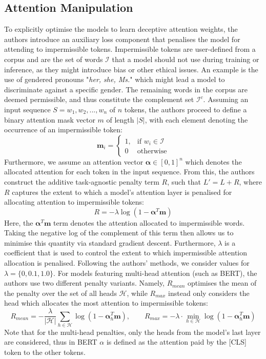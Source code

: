 \subsection{Attention Manipulation}
To explicitly optimise the models to learn deceptive attention weights, the authors introduce an auxiliary loss component that penalises the model for attending to impermissible tokens. Impermissible tokens are user-defined from a corpus and are the set of words $\mathcal{I}$ that a model should not use during training or inference, as they might introduce bias or other ethical issues. An example is the use of gendered pronouns "\textit{her, she, Ms.}" which might lead a model to discriminate against a specific gender. The remaining words in the corpus are deemed permissible, and thus constitute the complement set $\mathcal{I}^c$. Assuming an input sequence $S = w_1, w_2, ..., w_n$ of $n$ tokens, the authors proceed to define a binary attention mask vector $m$ of length $|S|$, with each element denoting the occurrence of an impermissible token:
\[\boldsymbol{m}_i=
\begin{cases}
      1, & \text{if }w_i \in \mathcal{I} \\
      0 & \text{otherwise}
   \end{cases}
\]
Furthermore, we assume an attention vector $\boldsymbol{\alpha} \in [0,1]^n$ which denotes the allocated attention for each token in the input sequence. From this, the authors construct the additive task-agnostic penalty term $R$, such that $L' = L + R$, where $R$ captures the extent to which a model's attention layer is penalised for allocating attention to impermissible tokens:
$$R=-\lambda \log(1-\boldsymbol{\alpha}^T\boldsymbol{m})$$
Here, the $\boldsymbol{\alpha}^T\boldsymbol{m}$ term denotes the attention allocated to impermissible words. Taking the negative log of the complement of this term then allows us to minimise this quantity via standard gradient descent. Furthermore, $\lambda$ is a coefficient that is used to control the extent to which impermissible attention allocation is penalised. Following the authors' methods, we consider values for $\lambda = \{0, 0.1, 1.0\}$. For models featuring multi-head attention (such as BERT), the authors use two different penalty variants. Namely, $R_{mean}$ optimises the mean of the penalty over the set of all heads $\mathcal{H}$, while $R_{max}$ instead only considers the head which allocates the most attention to impermissible tokens:
$$R_{mean} = -\frac{\lambda}{|\mathcal{H}|}\sum_{h\in \mathcal{H}} \log(1-\boldsymbol{\alpha}_{h}^{T}\boldsymbol{m}), \ \ \ \ \ \ \ \ \ R_{max}=-\lambda \cdot \min_{h \in \mathcal{H}} \log(1-\boldsymbol{\alpha}_{h}^{T}\boldsymbol{m})$$
Note that for the multi-head penalties, only the heads from the model's last layer are considered, thus in BERT $\alpha$ is defined as the attention paid by the [CLS] token to the other tokens.

